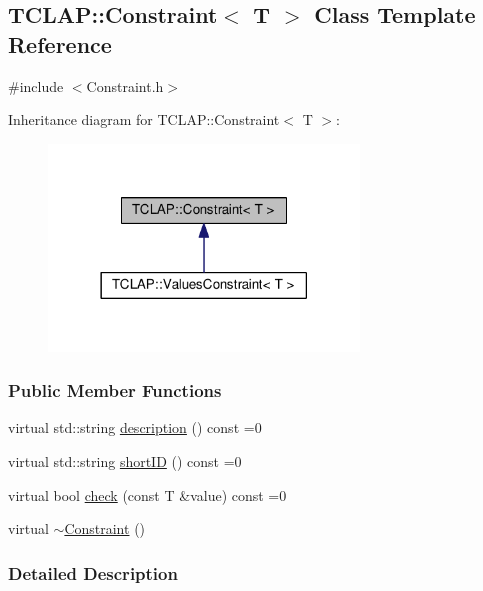 \hypertarget{classTCLAP_1_1Constraint}{}\subsection{T\+C\+L\+AP\+:\+:Constraint$<$ T $>$ Class Template Reference}
\label{classTCLAP_1_1Constraint}


{\ttfamily \#include $<$Constraint.\+h$>$}



Inheritance diagram for T\+C\+L\+AP\+:\+:Constraint$<$ T $>$\+:
\nopagebreak
\begin{figure}[H]
\begin{center}
\leavevmode
\includegraphics[width=234pt]{classTCLAP_1_1Constraint__inherit__graph}
\end{center}
\end{figure}
\subsubsection*{Public Member Functions}
\begin{DoxyCompactItemize}
\item 
virtual std\+::string \hyperlink{classTCLAP_1_1Constraint_ae16dd80aa217fb56c0862af5478afe01}{description} () const =0
\item 
virtual std\+::string \hyperlink{classTCLAP_1_1Constraint_a39f707895311da682439810a0bec4a5f}{short\+ID} () const =0
\item 
virtual bool \hyperlink{classTCLAP_1_1Constraint_a773c3e16d0150523c1c92b7b24868c34}{check} (const T \&value) const =0
\item 
virtual \hyperlink{classTCLAP_1_1Constraint_ae96bbe5301e9517b68b1597b36098224}{$\sim$\+Constraint} ()
\end{DoxyCompactItemize}


\subsubsection{Detailed Description}
